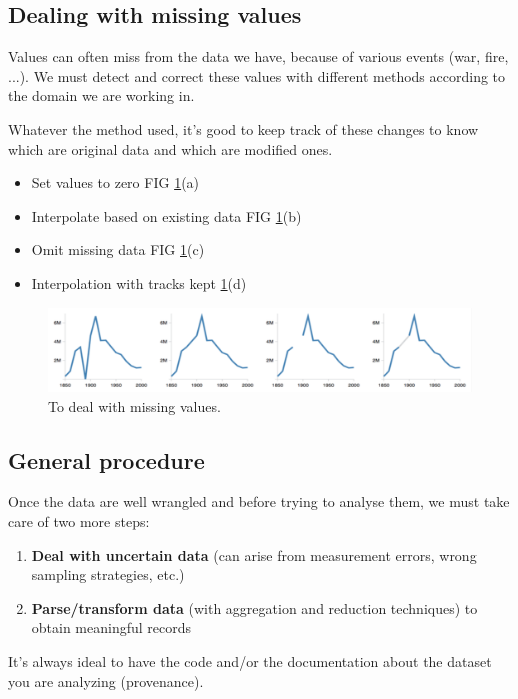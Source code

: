 \subsection{Dealing with missing values}

Values can often miss from the data we have, because of various events (war, fire, ...). We must detect and correct these values with different methods according to the domain we are working in.

Whatever the method used, it's good to keep track of these changes to know which are original data and which are modified ones.

\begin{itemize}
  \item Set values to zero FIG \ref{miss_val}(a)
  \item Interpolate based on existing data FIG \ref{miss_val}(b)
  \item Omit missing data FIG \ref{miss_val}(c)
  \item Interpolation with tracks kept \ref{miss_val}(d)
\end{itemize}

\begin{figure}[H]%
 \centering
 \includegraphics[width=15cm]{./img/03/missing_values}
 \caption{\label{miss_val}To deal with missing values.}
\end{figure}

\subsection{General procedure}

Once the data are well wrangled and before trying to analyse them, we must take care of two more steps:

\begin{enumerate}
  \item \textbf{Deal with uncertain data} (can arise from measurement errors, wrong sampling strategies, etc.)
  \item \textbf{Parse/transform data} (with aggregation and reduction techniques) to obtain meaningful records
\end{enumerate}
 
It's always ideal to have the code and/or the documentation about the dataset you are analyzing (provenance).
 